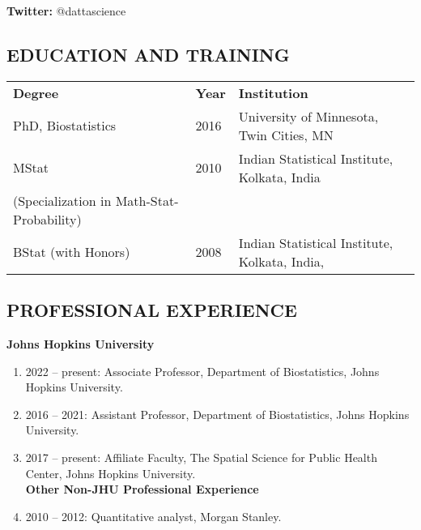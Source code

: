 \documentclass[12pt]{article}
\newcommand{\mydot}[1]{\begin{enumerate}[label=$\circ$,leftmargin=\parindent]\setlength{\itemsep}{#1}}
\newcommand{\ee}{\end{enumerate}}
\newcommand{\mylift}[1]{\vspace*{#1}}
\begin{document}
\textbf{Twitter:} @dattascience


\subsection*{EDUCATION AND TRAINING}

\smallskip



\begin{tabular}{lll}
\textbf{Degree} & \textbf{Year} & \textbf{Institution}\\
PhD, Biostatistics & 2016 & University of Minnesota, Twin Cities, MN\\
MStat & 2010 & Indian Statistical Institute, Kolkata, India\\
(Specialization in Math-Stat-Probability) & &  \\
BStat (with Honors) & 2008 & Indian Statistical Institute, Kolkata, India,
\end{tabular}






\subsection*{PROFESSIONAL EXPERIENCE}

\noindent \textbf{Johns Hopkins University}
\mydot{-0.1em}

\item \vskip -3mm
2022 -- present: Associate Professor, Department of Biostatistics, Johns Hopkins University.
\item 2016 -- 2021: Assistant Professor, Department of Biostatistics, Johns Hopkins University.
\item 2017 -- present: Affiliate Faculty, The Spatial Science for Public Health Center, Johns Hopkins University.\\ 
\vskip 2mm \noindent \textbf{Other Non-JHU Professional Experience}
\item 2010 -- 2012: Quantitative analyst, Morgan Stanley.

\ee
\end{document}
